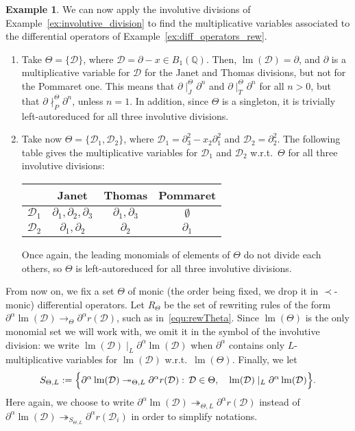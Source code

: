 \documentclass[10pt]{easychair}
\theoremstyle{definition}
\newtheorem{example}[theorem]{Example}
\newcommand\D{\mathcal{D}}
\DeclareMathOperator{\lm}{lm}
\newcommand\Q{\mathbb{Q}}
\newcommand\Weyl[1]{B_{#1}(\Q)}
\newcommand\rewTheta{\to_\Theta}
\newcommand\rewThetaS[1]{\twoheadrightarrow_{\Theta,#1}}
\newcommand\divInv[1]{\mid_{#1}}
\newcommand\RTheta{R_{\Theta}}
\newcommand\SThetaL{S_{\Theta,L}}
\begin{document}
\begin{example}\label{ex:multiplicative_variables}
  We can now apply the involutive divisions of 
  Example~\ref{ex:involutive_division} to find the multiplicative
  variables associated to the differential operators of
  Example~\ref{ex:diff_operators_rew}.
  \begin{enumerate}
  \item Take $\Theta = \{\D\}$, where $\D = \partial - x \in \Weyl 1$.
    Then, $\lm(\D) =\partial$, and $\partial$ is a multiplicative
    variable for $\D$ for the Janet and Thomas divisions, but not for the
    Pommaret one. This means that $\partial \divInv{J}^\Theta \partial^n$
    and $\partial \divInv{T}^\Theta \partial^n$ for all $n > 0$, but that
    $\partial \nmid_P^\Theta \partial^n$, unless $n = 1$. In addition,
    since $\Theta$ is a singleton, it is trivially left-autoreduced for
    all three involutive divisions. 
  \item Take now $\Theta = \{\D_1,\D_2\}$, where
    $\D_1=\partial_3^2 - x_2\partial_1^2$ and $\D_2 = \partial_2^2$. The
    following table gives the multiplicative variables for $\D_1$ and
    $\D_2$ w.r.t.\ $\Theta$ for all three involutive divisions:
    \begin{center}
    \begin{tabular}{l|ccc}
      & Janet & Thomas & Pommaret \\ \hline
      $\D_1$ & $\partial_1, \partial_2, \partial_3$ & $\partial_1, \partial_3$ & $\emptyset$ \\
      $\D_2$ & $\partial_1, \partial_2$ & $\partial_2$ & $\partial_1$ \\
    \end{tabular}
  \end{center}
    Once again, the leading monomials of elements of $\Theta$ do not divide
    each others, so $\Theta$ is left-autoreduced for all three involutive
    divisions.
  \end{enumerate}
\end{example}
\smallskip


From now on, we fix a set $\Theta$ of monic (the order being fixed, we
drop it in $\prec$-monic) differential operators. Let $\RTheta$  be the
set of rewriting rules of the form
$\partial^\alpha\lm(\D)\rewTheta\partial^\alpha r(\D)$, such as
in~\eqref{equ:rewTheta}. Since $\lm(\Theta)$ is the only monomial set we
will work with, we omit it in the symbol of the involutive division: we
write $\lm(\D)\divInv{L}\partial^\alpha\lm(\D)$ when $\partial^\alpha$
contains only $L$-multiplicative variables for $\lm(\D)$ w.r.t.\
$\lm(\Theta)$. Finally, we let
\begin{equation}\label{equ:S-strategy}
  \SThetaL:=\Big\{\partial^\alpha\lm(\D)\rewThetaS{L}\partial^\alpha
  r(\D) : \, \D\in\Theta,\quad\lm(\D)\divInv{L}\partial^\alpha\lm(\D)\Big\}.
  \smallskip
\end{equation}
Here again, we choose to write
$\partial^\alpha\lm(\D)\rewThetaS{L}\partial^\alpha r(\D)$ instead of
$\partial^\alpha\lm(\D)\twoheadrightarrow_{\SThetaL}\partial^\alpha
r(\D_i)$ in order to simplify notations.
\smallskip
\end{document}
